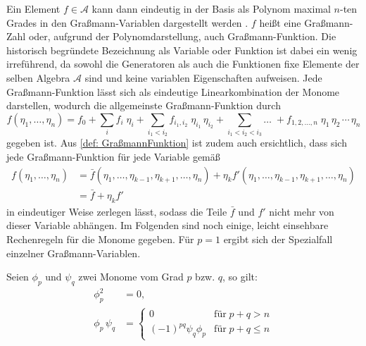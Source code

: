 \noindent  Ein Element $f\in\mathcal A$ kann dann eindeutig in der Basis als Polynom maximal $n$-ten Grades in den Graßmann-Variablen dargestellt werden \cite{BookRefForGV}.  $f$ heißt eine Graßmann-Zahl oder, aufgrund der Polynomdarstellung, auch Graßmann-Funktion. Die historisch begründete Bezeichnung als Variable oder Funktion ist dabei ein wenig irreführend, da sowohl die Generatoren als auch die Funktionen fixe Elemente der selben Algebra $\mathcal A$ sind und keine variablen Eigenschaften aufweisen. Jede Graßmann-Funktion lässt sich als eindeutige Linearkombination der Monome darstellen, wodurch die allgemeinste Graßmann-Funktion durch 
\begin{equation} \label{def: GraßmannFunktion}
    f(\eta_1, \dots ,\eta_n) = f_0 + \sum_{i} f_i \;\eta_i + \sum_{i_1<i_2} f_{i_1,i_2} \;\eta_{i_1} \,\eta_{i_2} + \sum_{i_1<i_2<i_3} \dots \;+ f_{1,2,\dots,n} \; \eta_{1}\,\eta_{2}\,\cdots\,\eta_{n}
\end{equation}
gegeben ist.  Aus \eqref{def: GraßmannFunktion} ist zudem auch ersichtlich, dass sich jede Graßmann-Funktion für jede Variable gemäß 
\begin{align} 
    f(\eta_1,\dots,\eta_n) &= \bar f(\eta_1,\dots,\eta_{k-1},\eta_{k+1}, \dots ,\eta_n) + \eta_k f'(\eta_1,\dots,\eta_{k-1},\eta_{k+1}, \dots ,\eta_n) \nonumber\\
        & = \bar f + \eta_k f' \label{eq: GraßmannZerlegung}
\end{align}
in eindeutiger Weise zerlegen lässt, sodass die Teile $\bar f$ und $f'$ nicht mehr von dieser Variable abhängen. \cite{GVinQuantumMechanics} \cite{GVFieldTheory} Im Folgenden sind noch einige, leicht einsehbare Rechenregeln für die Monome gegeben. Für $p=1$ ergibt sich der Spezialfall einzelner Graßmann-Variablen.

\begin{grayframe}
    Seien $\phi_p$ und $\psi_q$ zwei Monome vom Grad $p$ bzw. $q$, so gilt:
    \begin{align}
        \phi_p^2 &= 0  ,\label{eq: GraßmanProp 2}\\
        \phi_p \, \psi_q &= \left\{ \begin{array}{ll} 0 & \text{für}\; p+q > n \\ (-1)^{pq} \psi_q \phi_p  & \text{für}\; p+q \leq n\end{array} \right. \label{eq: GraßmanProp 3}
    \end{align}
\end{grayframe}

